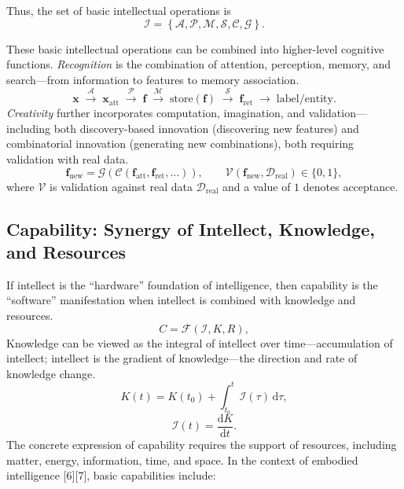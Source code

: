 \documentclass[12pt,a4paper]{article}
\newcommand{\Intell}{\mathcal{I}}
\newcommand{\Attn}{\mathcal{A}}
\newcommand{\Per}{\mathcal{P}}
\newcommand{\Mem}{\mathcal{M}}
\newcommand{\Srch}{\mathcal{S}}
\newcommand{\Comp}{\mathcal{C}}
\newcommand{\Imag}{\mathcal{G}}
\newcommand{\Vrfy}{\mathcal{V}}
\begin{document}
Thus, the set of basic intellectual operations is
\begin{equation}
\Intell=\left\{\Attn,\Per,\Mem,\Srch,\Comp,\Imag\right\}.
\label{eq:intellect-set}
\end{equation}

These basic intellectual operations can be combined into higher-level cognitive functions. \emph{Recognition} is the combination of attention, perception, memory, and search---from information to features to memory association.
\begin{equation}
\mathbf{x}\;\xrightarrow{\Attn}\;\mathbf{x}_{\mathrm{att}}
\;\xrightarrow{\Per}\;\mathbf{f}
\;\xrightarrow{\Mem}\;\mathrm{store}(\mathbf{f})
\;\xrightarrow{\Srch}\;\mathbf{f}_{\mathrm{ret}}
\;\rightarrow\;\mathrm{label/entity}.
\label{eq:recognition}
\end{equation}
\emph{Creativity} further incorporates computation, imagination, and validation---including both discovery-based innovation (discovering new features) and combinatorial innovation (generating new combinations), both requiring validation with real data.
\begin{equation}
\mathbf{f}_{\mathrm{new}}=\Imag\left(\Comp\left(\mathbf{f}_{\mathrm{att}},\mathbf{f}_{\mathrm{ret}},\dots\right)\right),\qquad
\Vrfy(\mathbf{f}_{\mathrm{new}},\mathcal{D}_{\mathrm{real}})\in\{0,1\},
\label{eq:creativity}
\end{equation}
where $\Vrfy$ is validation against real data $\mathcal{D}_{\mathrm{real}}$ and a value of $1$ denotes acceptance.

\subsection{Capability: Synergy of Intellect, Knowledge, and Resources}
If intellect is the ``hardware'' foundation of intelligence, then capability is the ``software'' manifestation when intellect is combined with knowledge and resources.
\begin{equation}
C=\mathcal{F}\left(\Intell,K,R\right),
\label{eq:capability}
\end{equation}
Knowledge can be viewed as the integral of intellect over time---accumulation of intellect; intellect is the gradient of knowledge---the direction and rate of knowledge change.
\begin{equation}
K(t)=K(t_0)+\int_{t_0}^{t}\Intell(\tau)\,\mathrm{d}\tau,
\label{eq:knowledge-integral}
\end{equation}
\begin{equation}
\Intell(t)=\frac{\mathrm{d}K}{\mathrm{d}t}.
\label{eq:intellect-gradient}
\end{equation}
The concrete expression of capability requires the support of resources, including matter, energy, information, time, and space. In the context of embodied intelligence [6][7], basic capabilities include:
\end{document}
